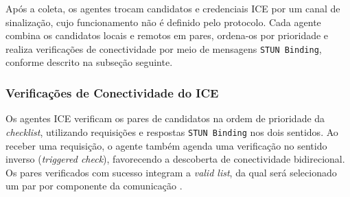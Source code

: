 Após a coleta, os agentes trocam candidatos e credenciais ICE por um canal de sinalização, cujo funcionamento não é definido pelo protocolo. Cada agente combina os candidatos locais e remotos em pares, ordena-os por prioridade e realiza verificações de conectividade por meio de mensagens \texttt{STUN Binding}, conforme descrito na subseção seguinte.

\subsubsection{Verificações de Conectividade do ICE}
\label{sec:ice_connectivity_checks}

Os agentes ICE verificam os pares de candidatos na ordem de prioridade da \textit{checklist}, utilizando requisições e respostas \texttt{STUN Binding} nos dois sentidos. Ao receber uma requisição, o agente também agenda uma verificação no sentido inverso (\textit{triggered check}), favorecendo a descoberta de conectividade bidirecional. Os pares verificados com sucesso integram a \textit{valid list}, da qual será selecionado um par por componente da comunicação \citep{rfc8445}.

